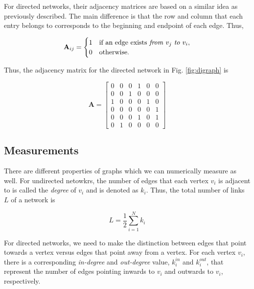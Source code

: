 \documentclass{article}
\begin{document}
\vspace{0.4cm}

For directed networks, their adjacency matrices are based on a similar idea as previously described.  The main difference is that the row and column that each entry belongs to corresponds to  the beginning and endpoint of each edge. Thus,

\begin{equation}
\textbf{A}_{ij} =
\begin{cases}
1 & \text{if an edge exists \textit{from} $v_j$ \textit{to} $v_i$},\\
0 & \text{otherwise}.
\end{cases}
\end{equation}

\vspace{0.4cm}

Thus, the adjacency matrix for the directed network in Fig. \ref{fig:digraph} is

\begin{equation}
\textbf{A} =
    \begin{bmatrix}
    0 & 0 & 0 & 1 & 0 & 0 \\
    0 & 0 & 1 & 0 & 0 & 0 \\
    1 & 0 & 0 & 0 & 1 & 0 \\
    0 & 0 & 0 & 0 & 0 & 1 \\
    0 & 0 & 0 & 1 & 0 & 1 \\
    0 & 1 & 0 & 0 & 0 & 0 
    \end{bmatrix}
\end{equation}





\subsection{Measurements}

There are different properties of graphs which we can numerically measure as well.  For undirected netowkrs, the number of edges that each vertex $v_i$ is adjacent to is called the \textit{degree} of $v_i$ and is denoted as $k_i$. Thus, the total number of links $L$ of a network is 

\begin{equation}
L = \frac{1}{2} \sum_{i=1}^{N} k_i
\end{equation}

For directed networks, we need to make the distinction between edges that point towards a vertex versus edges that point away from a vertex. For each vertex $v_i$, there is a corresponding \textit{in-degree} and \textit{out-degree} value, $k_i^{in}$ and $k_i^{out}$, that represent the number of edges pointing inwards to $v_i$ and outwards to $v_i$, respectively.
\end{document}
